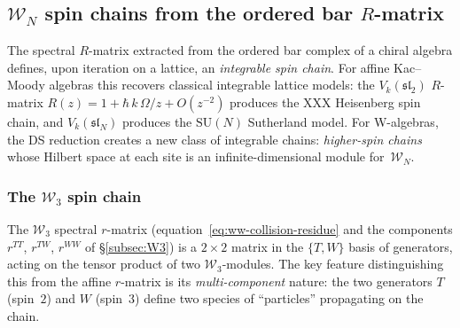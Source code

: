 
\subsection{$\mathcal{W}_N$ spin chains from the ordered bar
$R$-matrix}
\label{subsec:wn-spin-chains}

The spectral $R$-matrix extracted from the ordered bar complex
of a chiral algebra defines, upon iteration on a lattice, an
\emph{integrable spin chain}. For affine Kac--Moody algebras
this recovers classical integrable lattice models: the
$V_k(\mathfrak{sl}_2)$ $R$-matrix $R(z) = 1 + \hbar\,k\,\Omega/z
+ O(z^{-2})$ produces the XXX Heisenberg spin chain, and
$V_k(\mathfrak{sl}_N)$ produces the $\mathrm{SU}(N)$ Sutherland
model. For W-algebras, the DS reduction creates a new
class of integrable chains: \emph{higher-spin chains} whose
Hilbert space at each site is an infinite-dimensional module
for~$\mathcal{W}_N$.

\subsubsection{The $\mathcal{W}_3$ spin chain}

The $\mathcal{W}_3$ spectral $r$-matrix
(equation~\eqref{eq:ww-collision-residue} and the
components $r^{TT}$, $r^{TW}$, $r^{WW}$ of
\S\ref{subsec:W3}) is a $2 \times 2$ matrix in the
$\{T, W\}$ basis of generators, acting on the tensor product
of two $\mathcal{W}_3$-modules. The key feature distinguishing
this from the affine $r$-matrix is its \emph{multi-component}
nature: the two generators $T$ (spin~$2$) and $W$ (spin~$3$)
define two species of ``particles'' propagating on the chain.

